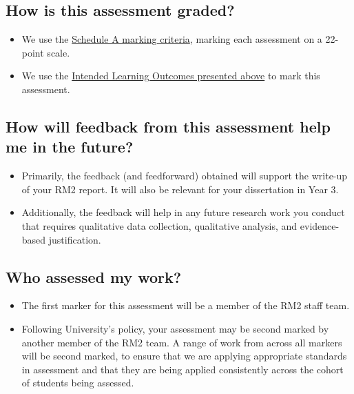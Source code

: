 \documentclass[
  english,
  letterpaper,
  DIV=11,
  numbers=noendperiod]{scrreprt}
\begin{document}
\subsection{How is this assessment
graded?}\label{how-is-this-assessment-graded-2}

\begin{itemize}
\item
  We use the
  \href{https://www.gla.ac.uk/media/Media_1200302_smxx.pdf}{Schedule A
  marking criteria}, marking each assessment on a 22-point scale.
\item
  We use the \hyperref[portfolio_ILOs]{Intended Learning Outcomes
  presented above} to mark this assessment.
\end{itemize}

\subsection{How will feedback from this assessment help me in the
future?}\label{how-will-feedback-from-this-assessment-help-me-in-the-future-1}

\begin{itemize}
\item
  Primarily, the feedback (and feedforward) obtained will support the
  write-up of your RM2 report. It will also be relevant for your
  dissertation in Year 3.
\item
  Additionally, the feedback will help in any future research work you
  conduct that requires qualitative data collection, qualitative
  analysis, and evidence-based justification.
\end{itemize}

\subsection{Who assessed my work?}\label{who-assessed-my-work-2}

\begin{itemize}
\item
  The first marker for this assessment will be a member of the RM2 staff
  team.
\item
  Following University's policy, your assessment may be second marked by
  another member of the RM2 team. A range of work from across all
  markers will be second marked, to ensure that we are applying
  appropriate standards in assessment and that they are being applied
  consistently across the cohort of students being assessed.
\end{itemize}
\end{document}

